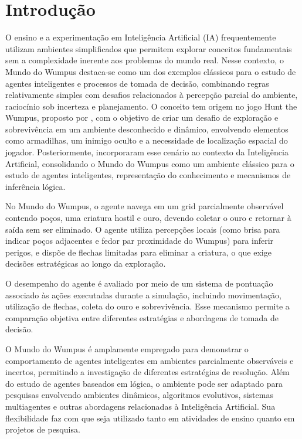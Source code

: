 \section{Introdução} \label{sec:firstpage}

O ensino e a experimentação em Inteligência Artificial (IA) frequentemente utilizam ambientes simplificados que permitem explorar conceitos fundamentais sem a complexidade inerente aos problemas do mundo real. Nesse contexto, o Mundo do Wumpus destaca-se como um dos exemplos clássicos para o estudo de agentes inteligentes e processos de tomada de decisão, combinando regras relativamente simples com desafios relacionados à percepção parcial do ambiente, raciocínio sob incerteza e planejamento. O conceito tem origem no jogo Hunt the Wumpus, proposto por \cite{yob1975hunt}, com o objetivo de criar um desafio de exploração e sobrevivência em um ambiente desconhecido e dinâmico, envolvendo elementos como armadilhas, um inimigo oculto e a necessidade de localização espacial do jogador. Posteriormente, \cite{russell2021artificial} incorporaram esse cenário ao contexto da Inteligência Artificial, consolidando o Mundo do Wumpus como um ambiente clássico para o estudo de agentes inteligentes, representação do conhecimento e mecanismos de inferência lógica.

No Mundo do Wumpus, o agente navega em um grid parcialmente observável contendo poços, uma criatura hostil e ouro, devendo coletar o ouro e retornar à saída sem ser eliminado. O agente utiliza percepções locais (como brisa para indicar poços adjacentes e fedor par proximidade do Wumpus) para inferir perigos, e dispõe de flechas limitadas para eliminar a criatura, o que exige decisões estratégicas ao longo da exploração.

O desempenho do agente é avaliado por meio de um sistema de pontuação associado às ações executadas durante a simulação, incluindo movimentação, utilização de flechas, coleta do ouro e sobrevivência. Esse mecanismo permite a comparação objetiva entre diferentes estratégias e abordagens de tomada de decisão.

O Mundo do Wumpus é amplamente empregado para demonstrar o comportamento de agentes inteligentes em ambientes parcialmente observáveis e incertos, permitindo a investigação de diferentes estratégias de resolução. Além do estudo de agentes baseados em lógica, o ambiente pode ser adaptado para pesquisas envolvendo ambientes dinâmicos, algoritmos evolutivos, sistemas multiagentes e outras abordagens relacionadas à Inteligência Artificial. Sua flexibilidade faz com que seja utilizado tanto em atividades de ensino quanto em projetos de pesquisa.

